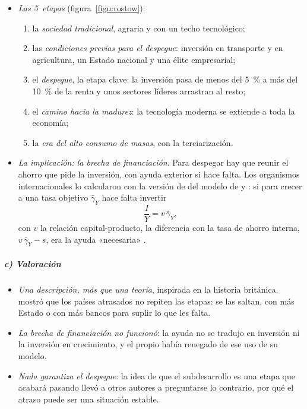 \documentclass[11pt]{article}
\begin{document}
\begin{itemize}
\item \emph{Las 5~etapas} (figura~\ref{figu:rostow}):
  \begin{enumerate}
  \item la \emph{sociedad tradicional}, agraria y con un techo tecnológico;
  \item las \emph{condiciones previas para el despegue}: inversión en transporte y en agricultura, un Estado nacional y una élite empresarial;
  \item el \emph{despegue}, la etapa clave: la inversión pasa de menos del 5~\% a más del 10~\% de la renta y unos sectores líderes arrastran al resto;
  \item el \emph{camino hacia la madurez}: la tecnología moderna se extiende a toda la economía;
  \item la \emph{era del alto consumo de masas}, con la terciarización.
  \end{enumerate}
\item \emph{La implicación: la brecha de financiación}. Para despegar hay que reunir el ahorro que pide la inversión, con ayuda exterior si hace falta. Los organismos internacionales lo calcularon con la versión de  del modelo de  y  : si para crecer a una tasa objetivo $\bar\gamma_Y$ hace falta invertir
  \[
  \frac{I}{Y}=v\,\bar\gamma_Y ,
  \]
  con $v$ la relación capital-producto, la diferencia con la tasa de ahorro interna, $v\,\bar\gamma_Y-s$, era la ayuda «necesaria» .
\end{itemize}

\begin{infografia}[H]
\centering
\caption{Las etapas del crecimiento de }\label{figu:rostow}
\end{infografia}

\subparagraph{c) Valoración}

\begin{itemize}
\item \emph{Una descripción, más que una teoría}, inspirada en la historia británica. \textcite{Gerschenkron1962} mostró que los países atrasados no repiten las etapas: se las saltan, con más Estado o con más bancos para suplir lo que les falta.
\item \emph{La brecha de financiación no funcionó}: la ayuda no se tradujo en inversión ni la inversión en crecimiento, y el propio  había renegado de ese uso de su modelo\nocite{Easterly1999,Easterly2003}.
\item \emph{Nada garantiza el despegue}: la idea de que el subdesarrollo es una etapa que acabará pasando llevó a otros autores a preguntarse lo contrario, por qué el atraso puede ser una situación estable.
\end{itemize}
\end{document}
